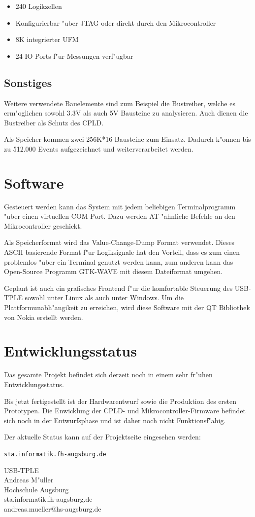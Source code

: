 \documentclass[
a4paper,
]{leaflet}
\begin{document}
\begin{itemize}
  \item 240 Logikzellen
  \item Konfigurierbar "uber JTAG oder direkt durch den Mikrocontroller
  \item 8K integrierter UFM
  \item 24 IO Ports f"ur Messungen verf"ugbar
\end{itemize}

\subsection{Sonstiges}

Weitere verwendete Bauelemente sind zum Beispiel die Bustreiber, welche es erm"oglichen sowohl 3.3V als auch 5V Bausteine zu analysieren. Auch dienen die Bustreiber als Schutz des CPLD.

Als Speicher kommen zwei 256K*16 Bausteine zum Einsatz. Dadurch k"onnen bis zu 512.000 Events aufgezeichnet und weiterverarbeitet werden. 

\section{Software}

Gesteuert werden kann das System mit jedem beliebigen Terminalprogramm "uber einen virtuellen COM Port. Dazu werden AT-"ahnliche Befehle an den Mikrocontroller geschickt.

Als Speicherformat wird das Value-Change-Dump Format verwendet. Dieses ASCII basierende Format f"ur Logiksignale hat den Vorteil, dass es zum einen problemlos "uber ein Terminal genutzt werden kann, zum anderen kann das Open-Source Programm GTK-WAVE mit diesem Dateiformat umgehen.

Geplant ist auch ein grafisches Frontend f"ur die komfortable Steuerung des USB-TPLE sowohl unter Linux als auch unter Windows. Um die Plattformunabh"angikeit zu erreichen, wird diese Software mit der QT Bibliothek von Nokia erstellt werden.

\section{Entwicklungsstatus}

Das gesamte Projekt befindet sich derzeit noch in einem sehr fr"uhen Entwicklungsstatus.

Bis jetzt fertigestellt ist der Hardwarentwurf sowie die Produktion des ersten Prototypen. Die Enwicklung der CPLD- und Mikrocontroller-Firmware befindet sich noch in der Entwurfsphase und ist daher noch nicht Funktionsf"ahig.

Der aktuelle Status kann auf der Projektseite eingesehen werden:

\vskip 30pt

\begin{center}
{\Large \tt sta.informatik.fh-augsburg.de}
\end{center}

\eject

\vspace*{\fill}

USB-TPLE\\Andreas M"uller\\Hochschule Augsburg\\sta.informatik.fh-augsburg.de\\andreas.mueller@hs-augsburg.de

\end{document}
